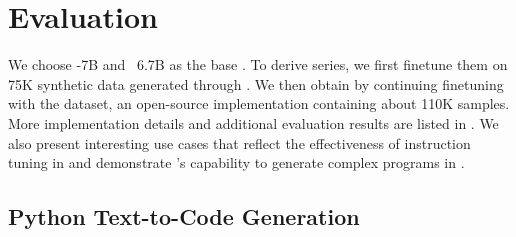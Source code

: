 \section{Evaluation}
We choose \codellamapy-7B and \dscoderbase~6.7B as the base .
To derive \model{} series, we first finetune them on 75K synthetic data generated through \tech{}.
We then obtain \modelx{} by continuing finetuning \model{} with the \evolcode{} dataset, an open-source \evolinstruct{} implementation containing about 110K samples.
{More implementation details and additional evaluation results are listed in . We also present interesting use cases that reflect the effectiveness of instruction tuning in  and demonstrate \model{}'s capability to generate complex programs in .}

\subsection{Python Text-to-Code Generation}

